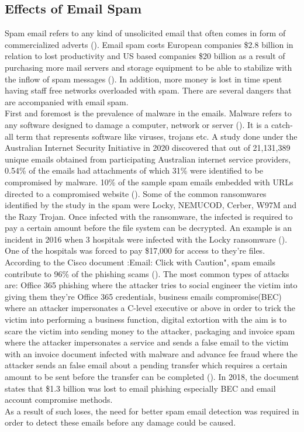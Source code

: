\subsection{Effects of Email Spam}
Spam email refers to any kind of unsolicited email that often comes in form of commercialized adverts (\cite{spam_jiss}). Email spam costs European companies \$2.8 billion in relation to lost productivity and US based companies \$20 billion as a result of purchasing more mail servers and storage equipment to be able to stabilize with the inflow of spam messages (\cite{spam_jiss}). In addition, more money is lost in time spent having staff free networks overloaded with spam. There are several dangers that are accompanied with email spam.\\
First and foremost is the prevalence of malware in the emails. Malware refers to any software designed to damage a computer, network or server (\cite{moir_2009}). It is a catch-all term that represents software like viruses, trojans etc. A study done under the Australian Internet Security Initiative in 2020 discovered that out of 21,131,389 unique emails obtained from participating Australian internet service providers, 0.54\% of the emails had attachments of which 31\% were identified to be compromised by malware. 10\% of the sample spam emails embedded with URLs directed to a compromised website (\cite{soam_malware}). Some of the common ransomwares identified by the study in the spam were Locky, NEMUCOD, Cerber, W97M and the Razy Trojan. Once infected with the ransomware, the infected is required to pay a certain amount before the file system can be decrypted. An example is an incident in 2016 when 3 hospitals were infected with the Locky ransomware (\cite{bbc_2016}). One of the hospitals was forced to pay \$17,000 for access to they're files.\\
According to the Cisco document :Email: Click with Caution", spam emails contribute to 96\% of the phishing scams (\cite{cisco_2019}). The most common types of attacks are: Office 365 phishing where the attacker tries to social engineer the victim into giving them they're Office 365 credentials, business emails compromise(BEC) where an attacker impersonates a C-level executive or above in order to trick the victim into performing a business function, digital extortion with the aim is to scare the victim into sending money to the attacker, packaging and invoice spam where the attacker impersonates a service and sends a false email to the victim with an invoice document infected with malware and advance fee fraud where the attacker sends an false email about a pending transfer which requires a certain amount to be sent before the transfer can be completed (\cite{cisco_2019}). In 2018, the document states that \$1.3 billion was lost to email phishing especially BEC and email account compromise methods.
\\
As a result of such loses, the need for better spam email detection was required in order to detect these emails before any damage could be caused.